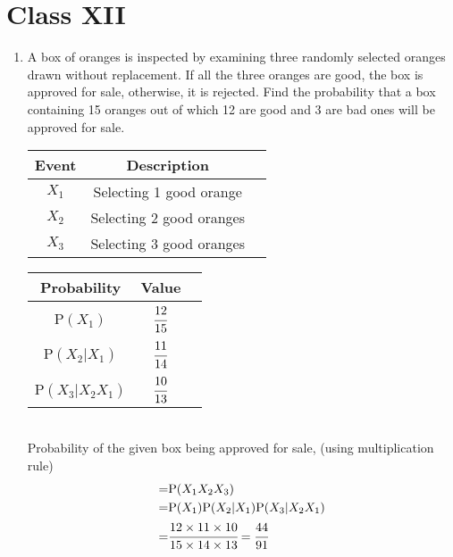 \documentclass[journal,12pt,twocolumn]{IEEEtran}
\renewcommand\thesection{\arabic{section}}
\begin{document}
\section*{Class XII}
\begin{enumerate}[label=13.\arabic{enumi}.\arabic{enumii}]%


\setcounter{enumi}{1}
\setcounter{enumii}{3}
\item A box of oranges is inspected by examining three randomly selected oranges drawn without replacement. If all the three oranges are good, the box is approved for sale, otherwise, it is rejected. Find the probability that a box containing 15 oranges out of which 12 are good and 3 are bad ones will be approved for sale.\\
	\solution
	\begin{table}[h!]
	\small
	\centering
		\begin{tabular}{|c|c|c|} \hline
			\textbf{Event}&\textbf{Description}\\ \hline
			$X_1$&Selecting 1 good orange  \\ \hline 
			$X_2$&Selecting 2 good oranges \\ \hline
			$X_3$&Selecting 3 good oranges \\ \hline
		\end{tabular}
	\end{table}
	\begin{table}[h!]
	\small
	\centering
		\begin{tabular}[20pt]{|c|c|c|} \hline
			\textbf{Probability}&\textbf{Value}\\ \hline
			P$(X_1)$ \T  &$\cfrac{12}{15}$  \\[1.5ex] \hline
			P$(X_2|X_1)$&$\cfrac{11}{14}$  \\[1.5ex] \hline
			P$(X_3|X_2X_1)$&$\cfrac{10}{13}$  \\[1.5ex] \hline
		\end{tabular}
	\end{table}\\
		Probability of the given box being approved for sale, (using multiplication rule)
	\begin{align}
		=& {}\text{P}(X_1 X_2 X_3) \\
		=& {}\text{P}(X_1)\text{P}(X_2|X_1)\text{P}(X_3|X_2X_1) \\
		=& \cfrac{12 \times 11 \times 10}{15 \times 14 \times 13} = \cfrac{44}{91}
	\end{align}


\end{enumerate}
\end{document}
